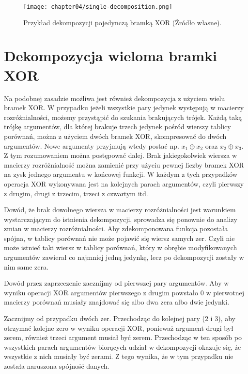 \begin{figure}[H]
\centering
\texttt{[image: chapter04/single-decomposition.png]}
\caption{Przykład dekompozycji pojedynczą bramką XOR (Źródło własne).}
\end{figure}

\section{Dekompozycja wieloma bramki XOR}

Na podobnej zasadzie możliwa jest również dekompozycja z użyciem wielu bramek XOR.
W przypadku jeżeli wszystkie pary jedynek występują w macierzy rozróżnialności,
możemy przystąpić do szukania brakujących trójek.
Każdą taką trójkę argumentów,
dla której brakuje trzech jedynek pośród wierszy tablicy porównań,
można z użyciem dwóch bramek XOR,
skompresować do dwóch argumentów.
Nowe argumenty przyjmują wtedy postać np. $x_1 \oplus x_2$ oraz $x_2 \oplus x_3$.
Z tym rozumowaniem można postępować dalej.
Brak jakiegokolwiek wiersza w macierzy rozróżnialność można zamienić przy użyciu pewnej liczby bramek XOR na zysk jednego argumentu w końcowej funkcji.
W każdym z tych przypadków operacja XOR wykonywana jest na kolejnych parach argumentów,
czyli pierwszy z drugim,
drugi z trzecim,
trzeci z czwartym itd.

Dowód,
że brak dowolnego wiersza w macierzy rozróżnialności jest warunkiem wystarczającym do istnienia dekompozycji,
sprowadza się ponownie do analizy zmian w macierzy rozróżnialności.
Aby zdekomponowana funkcja pozostała spójna,
w tablicy porównań nie może pojawić się wiersz samych zer.
Czyli nie może istnieć taki wiersz w tablicy porównań,
który w obrębie modyfikowanych argumentów zawierał co najmniej jedną jedynkę,
lecz po dekompozycji zostały w nim same zera.

Dowód przez zaprzeczenie zacznijmy od pierwszej pary argumentów.
Aby w wyniku operacji XOR argumentów pierwszego z drugim powstało 0 w pierwotnej macierzy porównań musiały znajdować się albo dwa zera albo dwie jedynki.

Zacznijmy od przypadku dwóch zer.
Przechodząc do kolejnej pary (2 i 3),
aby otrzymać kolejne zero w wyniku operacji XOR,
ponieważ argument drugi był zerem,
również trzeci argument musiał być zerem.
Przechodząc w ten sposób po wszystkich parach argumentów biorących udział w dekompozycji okazuje się,
że wszystkie z nich musiały być zerami.
Z tego wynika,
że w tym przypadku nie została naruszona spójność danych.

